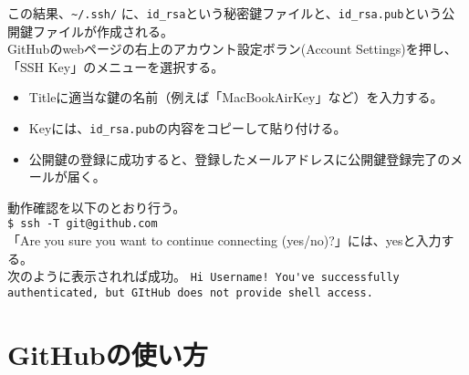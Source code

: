 \documentclass[11pt, oneside]{article}   	%
\begin{document}
この結果、\verb|~/.ssh/| に、\verb|id_rsa|という秘密鍵ファイルと、\verb|id_rsa.pub|という公開鍵ファイルが作成される。\\

GitHubのwebページの右上のアカウント設定ボラン(Account Settings)を押し、「SSH Key」のメニューを選択する。
\begin {itemize}
\item Titleに適当な鍵の名前（例えば「MacBookAirKey」など）を入力する。
\item Keyには、\verb|id_rsa.pub|の内容をコピーして貼り付ける。
\item 公開鍵の登録に成功すると、登録したメールアドレスに公開鍵登録完了のメールが届く。
\end{itemize}
動作確認を以下のとおり行う。\\
\verb|$ ssh -T git@github.com|\\
「Are you sure you want to continue connecting (yes/no)?」には、yesと入力する。\\
次のように表示されれば成功。
\verb|Hi Username! You've successfully authenticated, but GItHub does not provide shell access.|\\


\section{GitHubの使い方}




\verb||\\




\verb||
\end{document}
